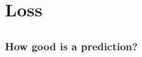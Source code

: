 \section{Loss}

\subsection{}

\begin{frame}
    \frametitle{How good is a prediction?}
\end{frame}

